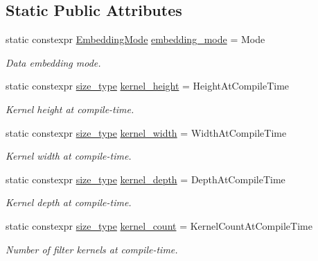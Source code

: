 \subsection*{Static Public Attributes}
\begin{DoxyCompactItemize}
\item 
static constexpr \hyperlink{namespaceffnn_1_1layer_1_1convolution_ad420d4eb8edd7c254d1f0aaaad81017f}{Embedding\-Mode} \hyperlink{structffnn_1_1layer_1_1convolution_1_1filter__options_a14397f4f0325a7b16fa81ea30b8cb063}{embedding\-\_\-mode} = Mode
\begin{DoxyCompactList}\small\item\em Data embedding mode. \end{DoxyCompactList}\item 
static constexpr \hyperlink{namespaceffnn_a63b90a2fd70eb76684eac482a51633e5}{size\-\_\-type} \hyperlink{structffnn_1_1layer_1_1convolution_1_1filter__options_a29ea922878c27749a2def9f843ccfaa6}{kernel\-\_\-height} = Height\-At\-Compile\-Time
\begin{DoxyCompactList}\small\item\em Kernel height at compile-\/time. \end{DoxyCompactList}\item 
static constexpr \hyperlink{namespaceffnn_a63b90a2fd70eb76684eac482a51633e5}{size\-\_\-type} \hyperlink{structffnn_1_1layer_1_1convolution_1_1filter__options_a0c003de4b336a7443b2aa5a7f78cc29c}{kernel\-\_\-width} = Width\-At\-Compile\-Time
\begin{DoxyCompactList}\small\item\em Kernel width at compile-\/time. \end{DoxyCompactList}\item 
static constexpr \hyperlink{namespaceffnn_a63b90a2fd70eb76684eac482a51633e5}{size\-\_\-type} \hyperlink{structffnn_1_1layer_1_1convolution_1_1filter__options_a3d16412aa799bd8a7357ea581dc33609}{kernel\-\_\-depth} = Depth\-At\-Compile\-Time
\begin{DoxyCompactList}\small\item\em Kernel depth at compile-\/time. \end{DoxyCompactList}\item 
static constexpr \hyperlink{namespaceffnn_a63b90a2fd70eb76684eac482a51633e5}{size\-\_\-type} \hyperlink{structffnn_1_1layer_1_1convolution_1_1filter__options_a2afd4fea93bd997949e6352c8ace4586}{kernel\-\_\-count} = Kernel\-Count\-At\-Compile\-Time
\begin{DoxyCompactList}\small\item\em Number of filter kernels at compile-\/time. \end{DoxyCompactList}\item 

\end{DoxyCompactItemize}
